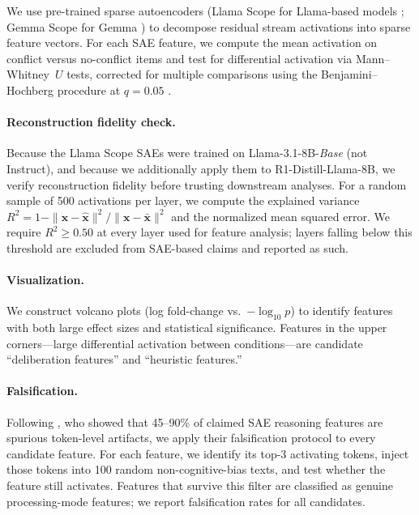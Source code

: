 We use pre-trained sparse autoencoders (Llama Scope for Llama-based models
\citep{he2024llama}; Gemma Scope for Gemma \citep{lieberum2024gemma}) to
decompose residual stream activations into sparse feature vectors.  For each
SAE feature, we compute the mean activation on conflict versus no-conflict
items and test for differential activation via Mann--Whitney~$U$ tests,
corrected for multiple comparisons using the Benjamini--Hochberg procedure
at $q = 0.05$ \citep{benjamini1995controlling}.

\paragraph{Reconstruction fidelity check.}
Because the Llama Scope SAEs were trained on Llama-3.1-8B-\emph{Base} (not
Instruct), and because we additionally apply them to R1-Distill-Llama-8B,
we verify reconstruction fidelity before trusting downstream analyses.
For a random sample of 500 activations per layer, we compute the
explained variance $R^2 = 1 - \|\mathbf{x} - \hat{\mathbf{x}}\|^2 /
\|\mathbf{x} - \bar{\mathbf{x}}\|^2$ and the normalized mean squared
error.  We require $R^2 \geq 0.50$ at every layer used for feature
analysis; layers falling below this threshold are excluded from
SAE-based claims and reported as such.

\paragraph{Visualization.}  We construct volcano plots (log fold-change vs.\
$-\log_{10} p$) to identify features with both large effect sizes and
statistical significance.  Features in the upper corners---large differential
activation between conditions---are candidate ``deliberation features'' and
``heuristic features.''

\paragraph{Falsification.}  Following \citet{ma2026falsification}, who
showed that 45--90\% of claimed SAE reasoning features are spurious
token-level artifacts, we apply their falsification protocol to every
candidate feature.  For each feature, we identify its top-3 activating tokens,
inject those tokens into 100 random non-cognitive-bias texts, and test whether
the feature still activates.  Features that survive this filter are classified
as genuine processing-mode features; we report falsification rates for all
candidates.


